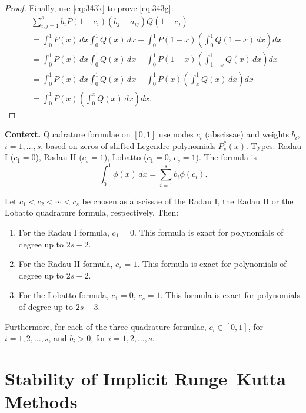 \begin{proof}
Finally, use \eqref{eq:343k} to prove \eqref{eq:343g}:
\begin{align*}
&\sum_{i,j=1}^{s} b_i P(1 - c_i)(b_j - a_{ij}) Q(1 - c_j) \\
&= \int_{0}^{1} P(x) \, dx \int_{0}^{1} Q(x) \, dx - \int_{0}^{1} P(1 - x) \left( \int_{0}^{1} Q(1 - x) \, dx \right) dx \\
&= \int_{0}^{1} P(x) \, dx \int_{0}^{1} Q(x) \, dx - \int_{0}^{1} P(1 - x) \left( \int_{1 - x}^{1} Q(x) \, dx \right) dx \\
&= \int_{0}^{1} P(x) \, dx \int_{0}^{1} Q(x) \, dx - \int_{0}^{1} P(x) \left( \int_{x}^{1} Q(x) \, dx \right) dx \\
&= \int_{0}^{1} P(x) \left( \int_{0}^{x} Q(x) \, dx \right) dx.
\end{align*}
\end{proof}

\noindent\textbf{Context.}
Quadrature formulae on $[0,1]$ use nodes $c_i$ (abscissae) and weights $b_i$, $i=1,\dots,s$, based on zeros of shifted Legendre polynomials $P_s^*(x)$. Types: Radau I ($c_1=0$), Radau II ($c_s=1$), Lobatto ($c_1=0$, $c_s=1$). The formula is
\[
\int_0^1 \phi(x)\,dx = \sum_{i=1}^s b_i \phi(c_i).
\]

\begin{theorem}

  \label{thm:344A}
Let \(c_1 < c_2 < \cdots < c_s\) be chosen as abscissae of the Radau I, the Radau II or the Lobatto quadrature formula, respectively. Then:
\begin{enumerate}
\renewcommand{\labelenumi}{\Roman{enumi}.}
\item For the Radau I formula, \(c_1 = 0\). This formula is exact for polynomials of degree up to \(2s - 2\).
\item For the Radau II formula, \(c_s = 1\). This formula is exact for polynomials of degree up to \(2s - 2\).
\item For the Lobatto formula, \(c_1 = 0\), \(c_s = 1\). This formula is exact for polynomials of degree up to \(2s - 3\).
\end{enumerate}
Furthermore, for each of the three quadrature formulae, \(c_i \in [0, 1]\), for \(i = 1, 2, \dots, s\), and \(b_i > 0\), for \(i = 1, 2, \dots, s\).
\end{theorem}

\section{Stability of Implicit Runge–Kutta Methods}


